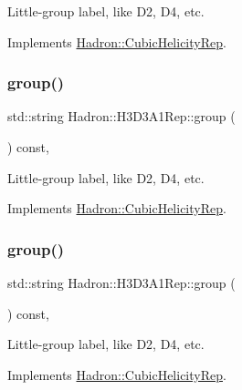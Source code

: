 Little-\/group label, like D2, D4, etc. 

Implements \mbox{\hyperlink{structHadron_1_1CubicHelicityRep_a101a7d76cd8ccdad0f272db44b766113}{Hadron\+::\+Cubic\+Helicity\+Rep}}.

\mbox{\label{structHadron_1_1H3D3A1Rep_a4b4fc6752f25df5714c95532184a4f8e}} 
\subsubsection{\texorpdfstring{group()}{group()}\hspace{0.1cm}{\footnotesize\ttfamily [3/5]}}
{\footnotesize\ttfamily std\+::string Hadron\+::\+H3\+D3\+A1\+Rep\+::group (\begin{DoxyParamCaption}{ }\end{DoxyParamCaption}) const\hspace{0.3cm}{\ttfamily [inline]}, {\ttfamily [virtual]}}

Little-\/group label, like D2, D4, etc. 

Implements \mbox{\hyperlink{structHadron_1_1CubicHelicityRep_a101a7d76cd8ccdad0f272db44b766113}{Hadron\+::\+Cubic\+Helicity\+Rep}}.

\mbox{\label{structHadron_1_1H3D3A1Rep_a4b4fc6752f25df5714c95532184a4f8e}} 
\subsubsection{\texorpdfstring{group()}{group()}\hspace{0.1cm}{\footnotesize\ttfamily [4/5]}}
{\footnotesize\ttfamily std\+::string Hadron\+::\+H3\+D3\+A1\+Rep\+::group (\begin{DoxyParamCaption}{ }\end{DoxyParamCaption}) const\hspace{0.3cm}{\ttfamily [inline]}, {\ttfamily [virtual]}}

Little-\/group label, like D2, D4, etc. 

Implements \mbox{\hyperlink{structHadron_1_1CubicHelicityRep_a101a7d76cd8ccdad0f272db44b766113}{Hadron\+::\+Cubic\+Helicity\+Rep}}.

\mbox{\label{structHadron_1_1H3D3A1Rep_a4b4fc6752f25df5714c95532184a4f8e}} 
